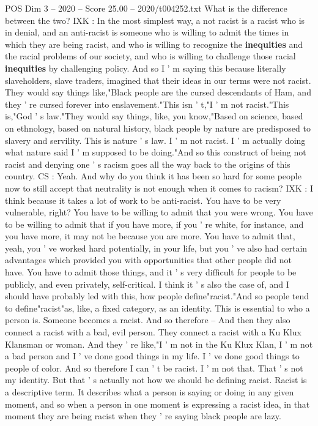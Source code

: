\begin{textsample}{POS Dim 3 – 2020 – Score 25.00 – 2020/t004252.txt}
What is the difference between the two?
IXK : In the most simplest way, a not racist is a racist who is in denial, and an anti-racist is someone who is willing to admit the times in which they are being racist, and who is willing to recognize the \textbf{inequities} and the racial problems of our society, and who is willing to challenge those racial \textbf{inequities} by challenging policy.
And so I ' m saying this because literally slaveholders, slave traders, imagined that their ideas in our terms were not racist.
They would say things like,"Black people are the cursed descendants of Ham, and they ' re cursed forever into enslavement."This isn ' t,"I ' m not racist."This is,"God ' s law."They would say things, like, you know,"Based on science, based on ethnology, based on natural history, black people by nature are predisposed to slavery and servility.
This is nature ' s law.
I ' m not racist.
I ' m actually doing what nature said I ' m supposed to be doing."And so this construct of being not racist and denying one ' s racism goes all the way back to the origins of this country.
CS : Yeah.
And why do you think it has been so hard for some people now to still accept that neutrality is not enough when it comes to racism?
IXK : I think because it takes a lot of work to be anti-racist.
You have to be very vulnerable, right?
You have to be willing to admit that you were wrong.
You have to be willing to admit that if you have more, if you ' re white, for instance, and you have more, it may not be because you are more.
You have to admit that, yeah, you ' ve worked hard potentially, in your life, but you ' ve also had certain advantages which provided you with opportunities that other people did not have.
You have to admit those things, and it ' s very difficult for people to be publicly, and even privately, self-critical.
I think it ' s also the case of, and I should have probably led with this, how people define"racist."And so people tend to define"racist"as, like, a fixed category, as an identity.
This is essential to who a person is.
Someone becomes a racist.
And so therefore -- And then they also connect a racist with a bad, evil person.
They connect a racist with a Ku Klux Klansman or woman.
And they ' re like,"I ' m not in the Ku Klux Klan, I ' m not a bad person and I ' ve done good things in my life.
I ' ve done good things to people of color.
And so therefore I can ' t be racist.
I ' m not that.
That ' s not my identity.
But that ' s actually not how we should be defining racist.
Racist is a descriptive term.
It describes what a person is saying or doing in any given moment, and so when a person in one moment is expressing a racist idea, in that moment they are being racist when they ' re saying black people are lazy.

\end{textsample}
